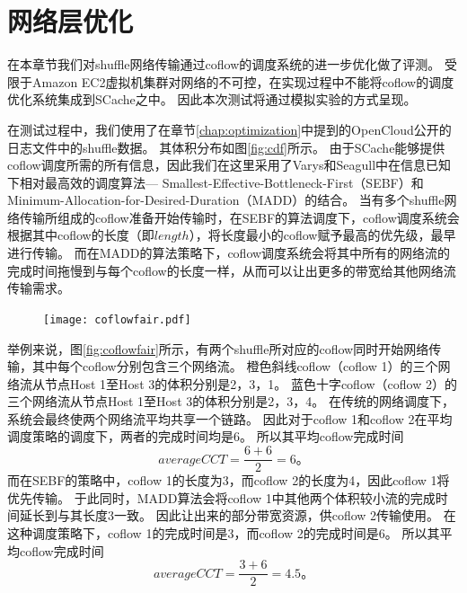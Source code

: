 \section{网络层优化}

在本章节我们对shuffle网络传输通过coflow的调度系统的进一步优化做了评测。
受限于Amazon EC2虚拟机集群对网络的不可控，在实现过程中不能将coflow的调度优化系统集成到SCache之中。
因此本次测试将通过模拟实验的方式呈现。

在测试过程中，我们使用了在章节\ref{chap:optimization}中提到的OpenCloud公开的日志文件中的shuffle数据。
其体积分布如图\ref{fig:cdf}所示。
由于SCache能够提供coflow调度所需的所有信息，因此我们在这里采用了Varys\cite{varys}和Seagull\cite{seagull}中在信息已知下相对最高效的调度算法---
Smallest-Effective-Bottleneck-First（SEBF）和Minimum-Allocation-for-Desired-Duration（MADD）的结合。
当有多个shuffle网络传输所组成的coflow准备开始传输时，在SEBF的算法调度下，coflow调度系统会根据其中coflow的长度（即$length$），将长度最小的coflow赋予最高的优先级，最早进行传输。
而在MADD的算法策略下，coflow调度系统会将其中所有的网络流的完成时间拖慢到与每个coflow的长度一样，从而可以让出更多的带宽给其他网络流传输需求。

\begin{figure}[!htp]
	\centering
	\texttt{[image: coflowfair.pdf]}
\end{figure}

举例来说，图\ref{fig:coflowfair}所示，有两个shuffle所对应的coflow同时开始网络传输，其中每个coflow分别包含三个网络流。
橙色斜线coflow（coflow 1）的三个网络流从节点Host 1至Host 3的体积分别是2，3，1。
蓝色十字coflow（coflow 2）的三个网络流从节点Host 1至Host 3的体积分别是2，3，4。
在传统的网络调度下，系统会最终使两个网络流平均共享一个链路。
因此对于coflow 1和coflow 2在平均调度策略的调度下，两者的完成时间均是6。
所以其平均coflow完成时间
\begin{equation}
    average CCT = \frac{6 + 6}{2} = 6。
\end{equation}
而在SEBF的策略中，coflow 1的长度为3，而coflow 2的长度为4，因此coflow 1将优先传输。
于此同时，MADD算法会将coflow 1中其他两个体积较小流的完成时间延长到与其长度3一致。
因此让出来的部分带宽资源，供coflow 2传输使用。
在这种调度策略下，coflow 1的完成时间是3，而coflow 2的完成时间是6。
所以其平均coflow完成时间
\begin{equation}
    average CCT = \frac{3 + 6}{2} = 4.5。
\end{equation}

